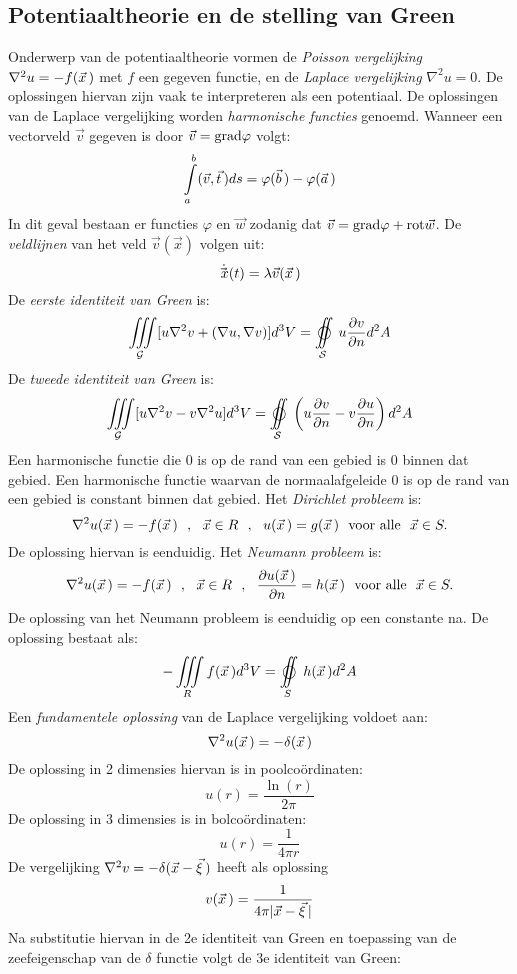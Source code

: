 \subsection{Potentiaaltheorie en de stelling van Green}
Onderwerp van de potentiaaltheorie vormen de {\it Poisson vergelijking}
$\nabla^2u=-f(\vec{x}\,)$ met $f$ een gegeven functie, en de {\it Laplace
vergelijking} $\nabla^2u=0$. De oplossingen hiervan zijn vaak te interpreteren
als een potentiaal. De oplossingen van de Laplace vergelijking worden
{\it harmonische functies} genoemd.
\npar
Wanneer een vectorveld $\vec{v}$ gegeven is door $\vec{v}={\rm grad}\varphi$
volgt:
\[
\int\limits_a^b(\vec{v},\vec{t}\,)ds=\varphi(\vec{b}\,)-\varphi(\vec{a}\,)
\]
In dit geval bestaan er functies $\varphi$ en $\vec{w}$ zodanig dat
$\vec{v}={\rm grad}\varphi+{\rm rot}\vec{w}$.
\npar
De {\it veldlijnen} van het veld $\vec{v}(\vec{x})$ volgen uit:
\[
\dot{\vec{x}\,}(t)=\lambda\vec{v}(\vec{x}\,)
\]
De {\it eerste identiteit van Green} is:
\[
\mathop{\iiint}\limits_{\cal\!\!\! G}[u\nabla^2v+(\nabla u,\nabla v)]d^3V=\mathop{\oiint}\limits_{\cal\!\!\!S}u\Q{v}{n}d^2A
\]
De {\it tweede identiteit van Green} is:
\[
\mathop{\iiint}\limits_{\cal\!\!\! G}[u\nabla^2v-v\nabla^2u]d^3V=\mathop{\oiint}\limits_{\cal\!\!\!S}\left(u\Q{v}{n}-v\Q{u}{n}\right)d^2A
\]
Een harmonische functie die 0 is op de rand van een gebied is 0 binnen dat
gebied. Een harmonische functie waarvan de normaalafgeleide 0 is op de rand van
een gebied is constant binnen dat gebied.
\npar
Het {\it Dirichlet probleem} is:
\[
\nabla^2u(\vec{x}\,)=-f(\vec{x}\,)~~,~~\vec{x}\in R~~,~~u(\vec{x}\,)=g(\vec{x}\,)~~\mbox{voor alle}~~\vec{x}\in S.
\]
De oplossing hiervan is eenduidig.
\npar
Het {\it Neumann probleem} is:
\[
\nabla^2u(\vec{x}\,)=-f(\vec{x}\,)~~,~~\vec{x}\in R~~,~~\frac{\partial u(\vec{x}\,)}{\partial n}=h(\vec{x}\,)~~\mbox{voor alle}~~\vec{x}\in S.
\]
De oplossing van het Neumann probleem is eenduidig op een constante na. De
oplossing bestaat als:
\[
-\mathop{\iiint}\limits_{\!\!\!R}f(\vvec{x})d^3V=\mathop{\oiint}\limits_{\!\!\!S}h(\vvec{x})d^2A
\]
Een {\it fundamentele oplossing} van de Laplace vergelijking voldoet aan:
\[
\nabla^2u(\vec{x}\,)=-\delta(\vec{x}\,)
\]
De oplossing in 2 dimensies hiervan is in poolco\"ordinaten:
\[
u(r)=\frac{\ln(r)}{2\pi}
\]
De oplossing in 3 dimensies is in bolco\"ordinaten:
\[
u(r)=\frac{1}{4\pi r}
\]
De vergelijking $\nabla^2v=-\delta(\vec{x}-\vec{\xi}\,)$ heeft als oplossing
\[
v(\vec{x}\,)=\frac{1}{4\pi|\vec{x}-\vec{\xi}\,|}
\]
Na substitutie hiervan in de 2e identiteit van Green en toepassing van de
zeefeigenschap van de $\delta$ functie volgt de 3e identiteit van Green:
